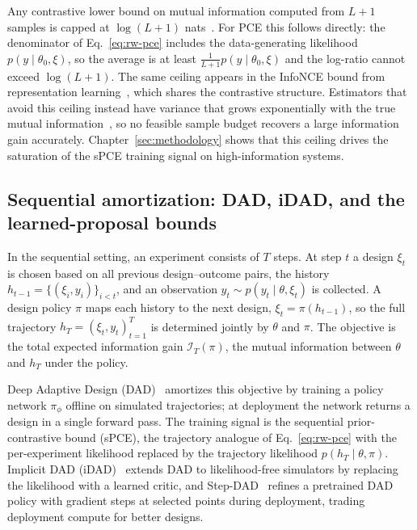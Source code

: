 Any contrastive lower bound on mutual information computed from $L{+}1$ samples is capped at $\log(L+1)$ nats~\citep{mcallester2020formal, Paninski2003EstimationOE}. For PCE this follows directly: the denominator of Eq.~\eqref{eq:rw-pce} includes the data-generating likelihood $p(y\mid\theta_0,\xi)$, so the average is at least $\frac{1}{L+1}p(y\mid\theta_0,\xi)$ and the log-ratio cannot exceed $\log(L+1)$. The same ceiling appears in the InfoNCE bound from representation learning~\citep{oord2018representation,poole2019variational}, which shares the contrastive structure. Estimators that avoid this ceiling instead have variance that grows exponentially with the true mutual information~\citep{song2020understanding}, so no feasible sample budget recovers a large information gain accurately. Chapter~\ref{sec:methodology} shows that this ceiling drives the saturation of the sPCE training signal on high-information systems.


\subsection{Sequential amortization: DAD, iDAD, and the learned-proposal bounds}
\label{sec:rw-dad}

In the sequential setting, an experiment consists of $T$ steps. At step $t$ a design $\xi_t$ is chosen based on all previous design--outcome pairs, the history $h_{t-1} = \{(\xi_i,y_i)\}_{i<t}$, and an observation $y_t \sim p(y_t \mid \theta, \xi_t)$ is collected. A design policy $\pi$ maps each history to the next design, $\xi_t = \pi(h_{t-1})$, so the full trajectory $h_T = {(\xi_t, y_t)}_{t=1}^T$ is determined jointly by $\theta$ and $\pi$. The objective is the total expected information gain $\mathcal{I}_T(\pi)$, the mutual information between $\theta$ and $h_T$ under the policy.

Deep Adaptive Design (DAD)~\citep{foster2021deep} amortizes this objective by training a policy network $\pi_\phi$ offline on simulated trajectories; at deployment the network returns a design in a single forward pass. The training signal is the sequential prior-contrastive bound (sPCE), the trajectory analogue of Eq.~\eqref{eq:rw-pce} with the per-experiment likelihood replaced by the trajectory likelihood $p(h_T\mid\theta,\pi)$. Implicit DAD (iDAD)~\citep{ivanova2021implicit} extends DAD to likelihood-free simulators by replacing the likelihood with a learned critic, and Step-DAD~\citep{hedman2025stepdad} refines a pretrained DAD policy with gradient steps at selected points during deployment, trading deployment compute for better designs.


